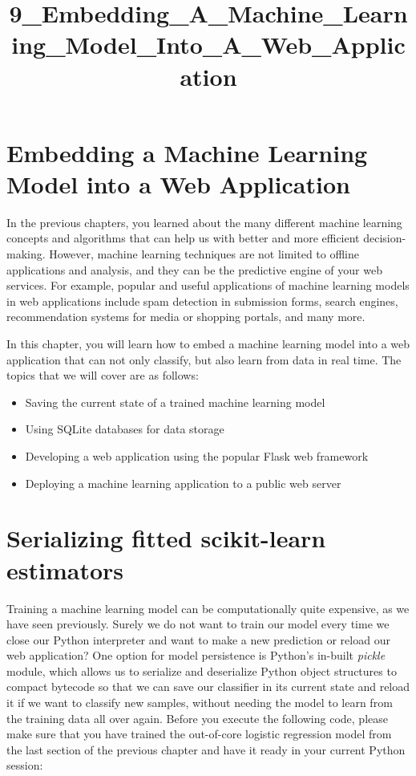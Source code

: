 \documentclass[11pt]{article}
\title{9\_Embedding\_A\_Machine\_Learning\_Model\_Into\_A\_Web\_Application}
\providecommand{\tightlist}{%
      \setlength{\itemsep}{0pt}\setlength{\parskip}{0pt}}
\begin{document}
    
    
    \maketitle
    
    

    
    \section{Embedding a Machine Learning Model into a Web
Application}\label{embedding-a-machine-learning-model-into-a-web-application}

    In the previous chapters, you learned about the many different machine
learning concepts and algorithms that can help us with better and more
efficient decision-making. However, machine learning techniques are not
limited to offline applications and analysis, and they can be the
predictive engine of your web services. For example, popular and useful
applications of machine learning models in web applications include spam
detection in submission forms, search engines, recommendation systems
for media or shopping portals, and many more.

In this chapter, you will learn how to embed a machine learning model
into a web application that can not only classify, but also learn from
data in real time. The topics that we will cover are as follows:

\begin{itemize}
\tightlist
\item
  Saving the current state of a trained machine learning model
\item
  Using SQLite databases for data storage
\item
  Developing a web application using the popular Flask web framework
\item
  Deploying a machine learning application to a public web server
\end{itemize}

    \section{Serializing fitted scikit-learn
estimators}\label{serializing-fitted-scikit-learn-estimators}

    Training a machine learning model can be computationally quite
expensive, as we have seen previously. Surely we do not want to train
our model every time we close our Python interpreter and want to make a
new prediction or reload our web application? One option for model
persistence is Python's in-built \emph{pickle} module, which allows us
to serialize and deserialize Python object structures to compact
bytecode so that we can save our classifier in its current state and
reload it if we want to classify new samples, without needing the model
to learn from the training data all over again. Before you execute the
following code, please make sure that you have trained the out-of-core
logistic regression model from the last section of the previous chapter
and have it ready in your current Python session:
\end{document}
